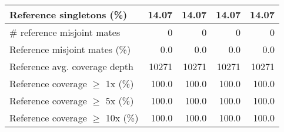 \documentclass[12pt,a4paper]{article}
\begin{document}
\begin{table}[ht]
\begin{center}
\begin{tabular}{|l*{4}{|r}|}
Reference singletons (\%) & 14.07 & 14.07 & 14.07 & 14.07 \\ \hline
\# reference misjoint mates & 0 & 0 & 0 & 0 \\ \hline
Reference misjoint mates (\%) & 0.0 & 0.0 & 0.0 & 0.0 \\ \hline
Reference avg. coverage depth & 10271 & 10271 & 10271 & 10271 \\ \hline
Reference coverage $\geq$ 1x (\%) & 100.0 & 100.0 & 100.0 & 100.0 \\ \hline
Reference coverage $\geq$ 5x (\%) & 100.0 & 100.0 & 100.0 & 100.0 \\ \hline
Reference coverage $\geq$ 10x (\%) & 100.0 & 100.0 & 100.0 & 100.0 \\ \hline
\end{tabular}
\end{center}
\end{table}
\end{document}

